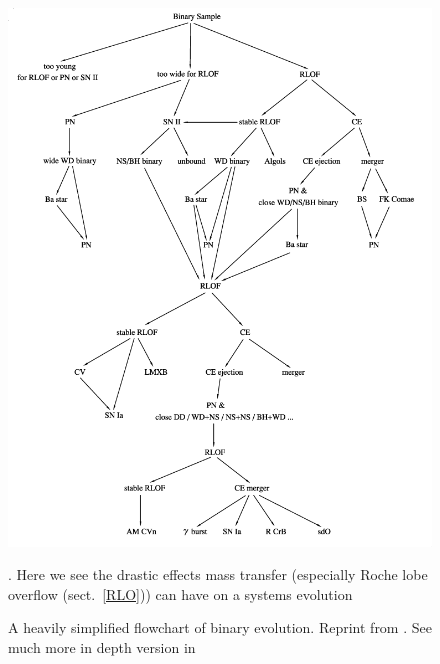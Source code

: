 \documentclass[12pt, a4paper]{article}
\begin{document}
    \vspace*{\fill}
    \begin{figure}[H]
        \centering
        \includegraphics[width=\textwidth]{figs/reused-figs/Han_BinaryEvolFlowchart.png}
        \caption{A heavily simplified flowchart of binary evolution. Reprint from \parencite{Han_2008}. See much more in depth version in \parencite{Chen_2024}}. Here we see the drastic effects mass transfer (especially Roche lobe overflow (sect.~\ref{RLO})) can have on a systems evolution
        \label{fig:binary_evolution_flowchart}
    \end{figure}
    \vspace*{\fill}
    \restoregeometry
\end{document}
